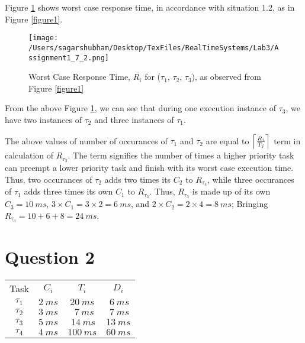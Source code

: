 \documentclass[oneside,a4paper]{article}
\DeclarePairedDelimiter{\ceil}{\lceil}{\rceil}
\begin{document}
Figure \ref{figure6} shows worst case response time, in accordance with situation 1.2, as in Figure \ref{figure1}.\par
\begin{center}
\begin{figure}[H]
                    \centering
                    \texttt{[image: /Users/sagarshubham/Desktop/TexFiles/RealTimeSystems/Lab3/Assignment1\_7\_2.png]}
                    \caption[Figure for Question 1.7 Part 2]{Worst Case Response Time, $R_i$ for ($\tau_1$, $\tau_2$, $\tau_3$), as observed from  Figure \ref{figure1}}
                    \label{figure6}        
\end{figure}
\end{center}\par
From the above Figure \ref{figure6}, we can see that during one execution instance of $\tau_3$, we have two instances of $\tau_2$ and three instances of $\tau_1$.\par
The above values of number of occurances of $\tau_1$ and $\tau_2$ are equal to $\ceil[\Big]{\frac{R_i}{T_j}}$ term in calculation of $R_{\tau_3}$. The term signifies the number of times a higher priority task can preempt a lower priority task and finish with its worst case execution time. Thus, two occurances of $\tau_2$ adds two times its $C_2$ to $R_{\tau_3}$, while three occurances of $\tau_1$ adds three times its own $C_1$ to $R_{\tau_3}$. Thus, $R_{\tau_3}$ is made up of its own $C_3 = 10\ ms$, $3 \times C_1 = 3 \times 2 = 6\ ms$, and $2 \times C_2 = 2 \times 4 = 8\ ms$; Bringing $R_{\tau_3} = 10 + 6 + 8 = 24\ ms$.
\pagebreak
\section{Question 2}
\begin{center}
\begin{tabular}{| c | c c c |}
\hline 
 Task & $C_i$ & $T_i$ & $D_i$ \\
 $\tau_1$ & $2\ ms$ & $ 20\ ms$ & $\ 6\ ms$  \\
 $\tau_2$ & $3\ ms$& $\ \ 7\ ms$ & $\ 7\ ms$ \\
 $\tau_3$ & $5\ ms$& $\ 14\ ms$ & $13\ ms$ \\
 $\tau_4$ & $4\ ms$& $100\ ms$ & $60\ ms$ \\
\hline
\end{tabular}
\end{center}
\end{document}
